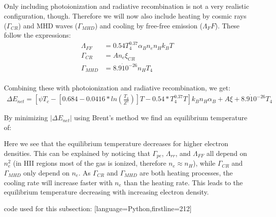 \subsection{}
Only including photoionization and radiative recombination is not a very realistic configuration, though.
Therefore we will now also include heating by cosmic rays ($\Gamma_{CR}$) and MHD waves ($\Gamma_{MHD}$) and cooling by free-free emission ($\Lambda_FF$).
These follow the expressions:
\begin{align} 
    \Lambda_{FF} &= 0.54 T^{0.37}_4 \alpha_B n_e n_H k_B T \\
    \Gamma_{CR} &= A n_e \xi_{CR} \\
    \Gamma_{MHD} &= 8.9\dot10^{-26} n_H T_4\\
\end{align}

Combining these with photoionization and radiative recombination, we get:
\begin{align}
    \Delta E_{net} = \left[ \psi T_c - \left[ 0.684 - 0.0416 * ln\left( \frac{T_4}{Z^2} \right)\right] T - 0.54 * T_4^{0.37} T\right] k_B n_H \alpha_B + A \xi + 8.9\dot10^{-26} T_4
\end{align}

By minimizing $| \Delta E_{net} |$ using Brent's method we find an equilibrium temperature of:


Here we see that the equilibrium temperature decreases for higher electron densities.
This can be explained by noticing that $\Gamma_{pe}$, $\Lambda_{rr}$, and $\Lambda_{FF}$ all depend on $n_e^2$ 
(in HII regions most of the gas is ionized, therefore $n_e \approx n_H$), while $\Gamma_{CR}$ and $\Gamma_{MHD}$ only depend on $n_e$.
As $\Gamma_{CR}$ and $\Gamma_{MHD}$ are both heating processes, the cooling rate will increase faster with $n_e$ than the heating rate.
This leads to the equilibrium temperature decreasing with increasing electron density.

code used for this subsection:
[language=Python,firstline=212]